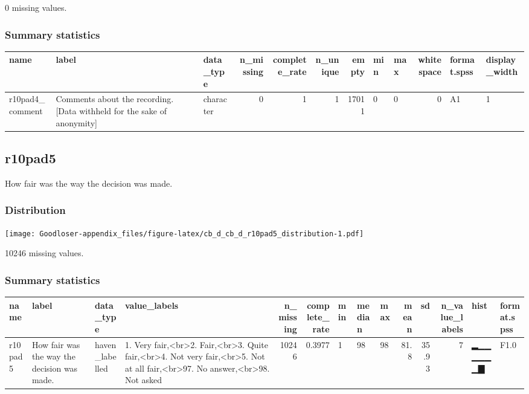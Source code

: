 \documentclass[
]{book}
\begin{document}
0 missing values.

\hypertarget{r10pad4_comment_summary}{%
\subsubsection{Summary statistics}\label{r10pad4_comment_summary}}

\begin{tabular}{l|l|l|r|r|r|r|l|l|r|l|l}
\hline
name & label & data_type & n_missing & complete_rate & n_unique & empty & min & max & whitespace & format.spss & display_width\\
\hline
r10pad4_comment & Comments about the recording. [Data withheld for the sake of anonymity] & character & 0 & 1 & 1 & 17011 & 0 & 0 & 0 & A1 & 1\\
\hline
\end{tabular}

\hypertarget{r10pad5}{%
\subsection{r10pad5}\label{r10pad5}}

How fair was the way the decision was made.

\hypertarget{r10pad5_distribution}{%
\subsubsection{Distribution}\label{r10pad5_distribution}}

\texttt{[image: Goodloser-appendix\_files/figure-latex/cb\_d\_cb\_d\_r10pad5\_distribution-1.pdf]}

10246 missing values.

\hypertarget{r10pad5_summary}{%
\subsubsection{Summary statistics}\label{r10pad5_summary}}

\begin{tabular}{l|l|l|l|r|r|l|l|l|r|r|r|l|l}
\hline
name & label & data_type & value_labels & n_missing & complete_rate & min & median & max & mean & sd & n_value_labels & hist & format.spss\\
\hline
r10pad5 & How fair was the way the decision was made. & haven_labelled & 1. Very fair,<br>2. Fair,<br>3. Quite fair,<br>4. Not very fair,<br>5. Not at all fair,<br>97. No answer,<br>98. Not asked & 10246 & 0.3977 & 1 & 98 & 98 & 81.8 & 35.93 & 7 & ▂▁▁▁▁▁▁▇ & F1.0\\
\hline
\end{tabular}
\end{document}
